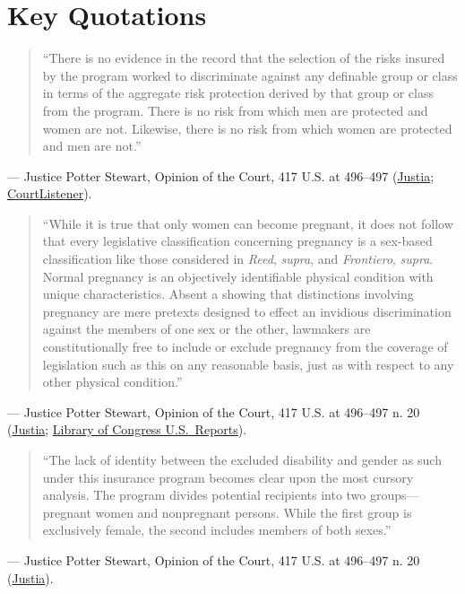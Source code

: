 \documentclass[12pt]{article}
\begin{document}
\section{Key Quotations}

\begin{quote}
``There is no evidence in the record that the selection of the risks insured by the program worked to discriminate against any definable group or class in terms of the aggregate risk protection derived by that group or class from the program. There is no risk from which men are protected and women are not. Likewise, there is no risk from which women are protected and men are not.''
\end{quote}
\noindent --- Justice Potter Stewart, Opinion of the Court, 417 U.S. at 496--497 (\href{https://supreme.justia.com/cases/federal/us/417/484/}{Justia}; \href{https://www.courtlistener.com/opinion/109065/geduldig-v-aiello/}{CourtListener}).

\begin{quote}
``While it is true that only women can become pregnant, it does not follow that every legislative classification concerning pregnancy is a sex-based classification like those considered in \textit{Reed}, \textit{supra}, and \textit{Frontiero}, \textit{supra}. Normal pregnancy is an objectively identifiable physical condition with unique characteristics. Absent a showing that distinctions involving pregnancy are mere pretexts designed to effect an invidious discrimination against the members of one sex or the other, lawmakers are constitutionally free to include or exclude pregnancy from the coverage of legislation such as this on any reasonable basis, just as with respect to any other physical condition.''
\end{quote}
\noindent --- Justice Potter Stewart, Opinion of the Court, 417 U.S. at 496--497 n. 20 (\href{https://supreme.justia.com/cases/federal/us/417/484/}{Justia}; \href{https://tile.loc.gov/storage-services/service/ll/usrep/usrep417/usrep417484/usrep417484.pdf}{Library of Congress U.S.\ Reports}).

\begin{quote}
``The lack of identity between the excluded disability and gender as such under this insurance program becomes clear upon the most cursory analysis. The program divides potential recipients into two groups---pregnant women and nonpregnant persons. While the first group is exclusively female, the second includes members of both sexes.''
\end{quote}
\noindent --- Justice Potter Stewart, Opinion of the Court, 417 U.S. at 496--497 n. 20 (\href{https://supreme.justia.com/cases/federal/us/417/484/}{Justia}).
\end{document}
